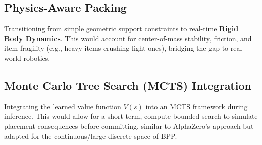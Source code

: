 \documentclass{article}
\begin{document}
\subsection{Physics-Aware Packing}
Transitioning from simple geometric support constraints to real-time \textbf{Rigid Body Dynamics}. This would account for center-of-mass stability, friction, and item fragility (e.g., heavy items crushing light ones), bridging the gap to real-world robotics.

\subsection{Monte Carlo Tree Search (MCTS) Integration}
Integrating the learned value function $V(s)$ into an MCTS framework during inference. This would allow for a short-term, compute-bounded search to simulate placement consequences before committing, similar to AlphaZero's approach but adapted for the continuous/large discrete space of BPP.
\end{document}
